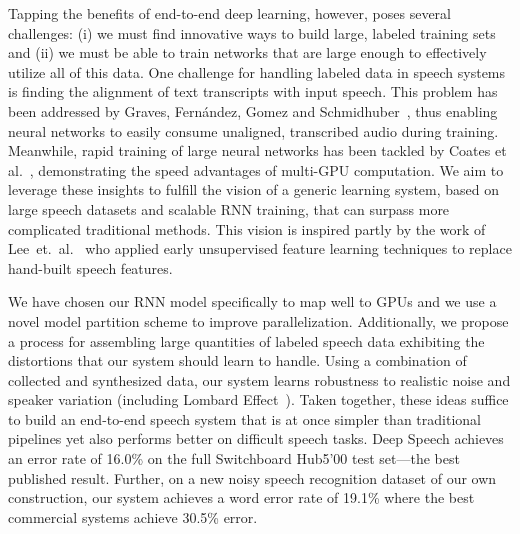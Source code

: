 Tapping the benefits of end-to-end deep learning, however, poses several
challenges: (i) we must find innovative ways to build large, labeled training
sets and (ii) we must be able to train networks that are large enough to
effectively utilize all of this data. One challenge for handling labeled data
in speech systems is finding the alignment of text transcripts with input
speech. This problem has been addressed by Graves, Fern\'{a}ndez, Gomez and
Schmidhuber~\cite{graves2006}, thus enabling neural networks to easily consume
unaligned, transcribed audio during training. Meanwhile, rapid training of
large neural networks has been tackled by Coates et
al.~\cite{coates2013cotshpc}, demonstrating the speed advantages of multi-GPU
computation. We aim to leverage these insights to fulfill the vision of a
generic learning system, based on large speech datasets and scalable RNN
training, that can surpass more complicated traditional methods. This vision
is inspired partly by the work of Lee~et.~al.~\cite{lee2009} who
applied early unsupervised feature learning techniques to replace hand-built
speech features.

We have chosen our RNN model specifically to map well to GPUs and we use a
novel model partition scheme to improve parallelization. Additionally, we
propose a process for assembling large quantities of labeled speech data
exhibiting the distortions that our system should learn to handle. Using a
combination of collected and synthesized data, our system learns robustness to
realistic noise and speaker variation (including Lombard
Effect~\cite{junqua1993lombard}). Taken together, these ideas suffice to build
an end-to-end speech system that is at once simpler than traditional pipelines
yet also performs better on difficult speech tasks. Deep Speech achieves an
error rate of 16.0\% on the full Switchboard Hub5'00 test set---the best
published result. Further, on a new noisy speech recognition dataset of our own
construction, our system achieves a word error rate of 19.1\% where the best
commercial systems achieve 30.5\% error.
